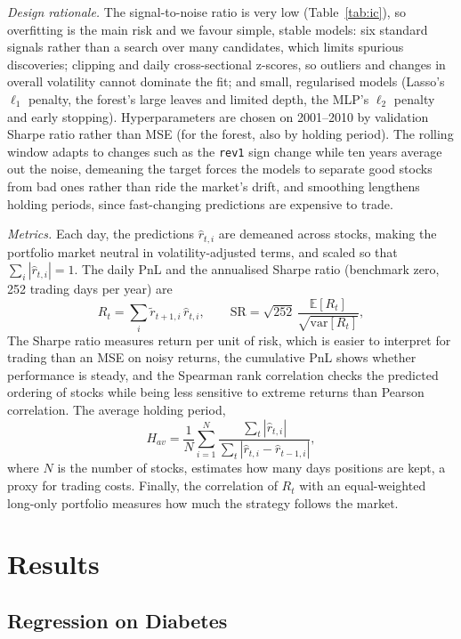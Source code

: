 \documentclass[conference]{IEEEtran}
\begin{document}
\textit{Design rationale.} The signal-to-noise ratio is very low (Table~\ref{tab:ic}), so overfitting is the main risk and we favour simple, stable models: six standard signals rather than a search over many candidates, which limits spurious discoveries; clipping and daily cross-sectional z-scores, so outliers and changes in overall volatility cannot dominate the fit; and small, regularised models (Lasso's $\ell_1$ penalty, the forest's large leaves and limited depth, the MLP's $\ell_2$ penalty and early stopping). Hyperparameters are chosen on 2001--2010 by validation Sharpe ratio rather than MSE (for the forest, also by holding period). The rolling window adapts to changes such as the \texttt{rev1} sign change while ten years average out the noise, demeaning the target forces the models to separate good stocks from bad ones rather than ride the market's drift, and smoothing lengthens holding periods, since fast-changing predictions are expensive to trade.

\textit{Metrics.} Each day, the predictions $\hat r_{t,i}$ are demeaned across stocks, making the portfolio market neutral in volatility-adjusted terms, and scaled so that $\sum_i|\hat r_{t,i}|=1$. The daily PnL and the annualised Sharpe ratio (benchmark zero, 252 trading days per year) are
\begin{equation}
R_t=\sum_i\tilde r_{t+1,i}\,\hat r_{t,i},\qquad \mathrm{SR}=\sqrt{252}\,\frac{\mathbb{E}[R_t]}{\sqrt{\mathrm{var}[R_t]}},
\label{eq:sharpe}
\end{equation}
The Sharpe ratio measures return per unit of risk, which is easier to interpret for trading than an MSE on noisy returns, the cumulative PnL shows whether performance is steady, and the Spearman rank correlation checks the predicted ordering of stocks while being less sensitive to extreme returns than Pearson correlation. The average holding period,
\begin{equation}
H_{av}=\frac{1}{N}\sum_{i=1}^{N}\frac{\sum_{t}|\hat r_{t,i}|}{\sum_{t}|\hat r_{t,i}-\hat r_{t-1,i}|},
\label{eq:hold}
\end{equation}
where $N$ is the number of stocks, estimates how many days positions are kept, a proxy for trading costs. Finally, the correlation of $R_t$ with an equal-weighted long-only portfolio measures how much the strategy follows the market.

\section{Results}
\subsection{Regression on Diabetes}
\label{sec:reg}
\end{document}
